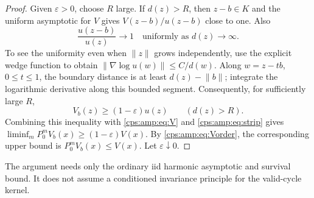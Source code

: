 \documentclass[11pt,letterpaper]{article}
\numberwithin{equation}{section}
\theoremstyle{remark}\newtheorem{remark}[theorem]{Remark}
\newcommand{\norm}[1]{\lVert#1\rVert}
\begin{document}
\begin{proof}
Given $\varepsilon>0$, choose $R$ large. If $d(z)>R$, then $z-b\in K$ and the uniform asymptotic for $V$ gives $V(z-b)/u(z-b)$ close to one. Also
\begin{equation}\label{cps:amp:eq:ushift}
 \frac{u(z-b)}{u(z)}\longrightarrow1
 \quad\text{uniformly as }d(z)\longrightarrow\infty.
\end{equation}
To see the uniformity even when $\norm z$ grows independently, use the explicit wedge function to obtain $\norm{\nabla\log u(w)}\le C/d(w)$. Along $w=z-tb$, $0\le t\le1$, the boundary distance is at least $d(z)-\norm b$; integrate the logarithmic derivative along this bounded segment. Consequently, for sufficiently large $R$,
\begin{equation}
 V_b(z)\ge(1-\varepsilon)u(z)\qquad(d(z)>R).
\end{equation}
Combining this inequality with \eqref{cps:amp:eq:V} and \eqref{cps:amp:eq:strip} gives
$\liminf_mP_0^mV_b(x)\ge(1-\varepsilon)V(x)$. By \eqref{cps:amp:eq:Vorder}, the corresponding upper bound is $P_0^mV_b(x)\le V(x)$. Let $\varepsilon\downarrow0$.
\end{proof}
The argument needs only the ordinary iid harmonic asymptotic and survival bound. It does not assume a conditioned invariance principle for the valid-cycle kernel.
\end{document}
